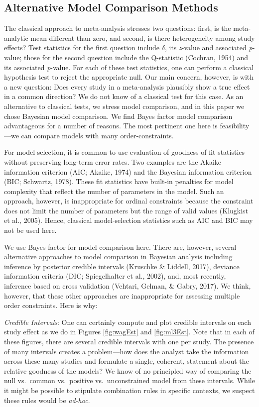 \documentclass[english,man]{apa6}
\theoremstyle{definition}
\theoremstyle{definition}
\theoremstyle{definition}
\theoremstyle{remark}
\begin{document}
\subsection{Alternative Model Comparison
Methods}\label{alternative-model-comparison-methods}

The classical approach to meta-analysis stresses two questions: first,
is the meta-analytic mean different than zero, and second, is there
heterogeneity among study effects? Test statistics for the first
question include \(\delta\), its \emph{z}-value and associated
\emph{p}-value; those for the second question include the Q-statistic
(Cochran, 1954) and its associated \emph{p}-value. For each of these
test statistics, one can perform a classical hypothesis test to reject
the appropriate null. Our main concern, however, is with a new question:
Does every study in a meta-analysis plausibly show a true effect in a
common direction? We do not know of a classical test for this case. As
an alternative to classical tests, we stress model comparison, and in
this paper we chose Bayesian model comparison. We find Bayes factor
model comparison advantageous for a number of reasons. The most
pertinent one here is feasibility---we can compare models with many
order-constraints.

For model selection, it is common to use evaluation of goodness-of-fit
statistics without preserving long-term error rates. Two examples are
the Akaike information criterion (AIC; Akaike, 1974) and the Bayesian
information criterion (BIC; Schwartz, 1978). These fit statistics have
built-in penalties for model complexity that reflect the number of
parameters in the model. Such an approach, however, is inappropriate for
ordinal constraints because the constraint does not limit the number of
parameters but the range of valid values (Klugkist et al., 2005). Hence,
classical model-selection statistics such as AIC and BIC may not be used
here.

We use Bayes factor for model comparison here. There are, however,
several alternative approaches to model comparison in Bayesian analysis
including inference by posterior credible intervals (Kruschke \&
Liddell, 2017), deviance information criteria (DIC; Spiegelhalter et
al., 2002), and, most recently, inference based on cross validation
(Vehtari, Gelman, \& Gabry, 2017). We think, however, that these other
approaches are inappropriate for assessing multiple order constraints.
Here is why:

\emph{Credible Intervals}: One can certainly compute and plot credible
intervals on each study effect as we do in Figures \ref{fig:wagEst} and
\ref{fig:ml3Est}. Note that in each of these figures, there are several
credible intervals with one per study. The presence of many intervals
creates a problem---how does the analyst take the information across
these many studies and formulate a single, coherent, statement about the
relative goodness of the models? We know of no principled way of
comparing the null vs.~common vs.~positive vs.~unconstrained model from
these intervals. While it might be possible to stipulate combination
rules in specific contexts, we suspect these rules would be
\emph{ad-hoc}.
\end{document}
